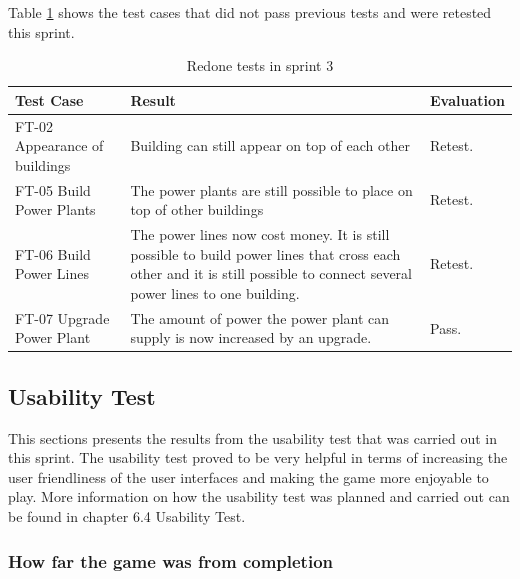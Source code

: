 	Table \ref{table:retestssprint3} shows the test cases that did not pass previous tests and were retested this sprint.

	\begin{table}[H]
	\begin{tabular}{| p{3cm} | p{6.5cm} | p{2.5cm} |}
		\hline
		\rowcolor{lightgray}
		{\bf Test Case} & {\bf Result} & {\bf Evaluation} \\ \hline

		FT-02 Appearance of buildings & Building can still appear on top of each other & Retest. \\ \hline

	  	FT-05 Build Power Plants & The power plants are still possible to place on top of other buildings & Retest. \\ \hline

	  	FT-06 Build Power Lines & The power lines now cost money. It is still possible to build power lines that cross each other and it is still possible to connect several power lines to one building. & Retest. \\ \hline

	  	FT-07 Upgrade Power Plant & The amount of power the power plant can supply is now increased by an upgrade. & Pass. \\ \hline
	\end{tabular}
	\caption{Redone tests in sprint 3}
	\label{table:retestssprint3}
	\end{table}

\subsection{Usability Test}

	This sections presents the results from the usability test that was carried out in this sprint. The usability test proved to be very helpful in terms of increasing the user friendliness of the user interfaces and making the game more enjoyable to play. More information on how the usability test was planned and carried out can be found in chapter 6.4 Usability Test.

	\subsubsection*{How far the game was from completion}

